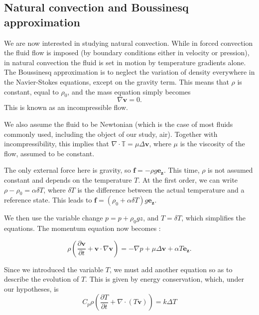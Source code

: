 \documentclass[12pt]{article}
\newcommand{\vb}[1]{\ensuremath{\mathbf{#1}}}
\begin{document}
\subsection{Natural convection and Boussinesq approximation}
We are now interested in studying natural convection. While in forced
convection the fluid flow is imposed (by boundary conditions either in
velocity or pression), in natural convection the fluid is set in
motion by temperature gradients alone. The Boussinesq approximation is
to neglect the variation of density everywhere in the Navier-Stokes
equations, except on the gravity term. This means that $\rho$ is
constant, equal to $\rho_0$, and the mass equation simply becomes
\begin{equation}
  \label{ns-b-mass}
  \nabla \vb{v} = 0.
\end{equation}
This is known as an incompressible flow.

We also assume the fluid to be Newtonian (which is the case of most
fluids commonly used, including the object of our study,
air). Together with incompressibility, this implies that $\nabla \cdot
\mathbb T = \mu \Delta \vb{v}$, where $\mu$ is the viscosity of the flow,
assumed to be constant.

The only external force here is gravity, so $\vb{f} = -\rho g
\vb{e_z}$. This time, $\rho$ is not assumed constant and depends on
the temperature $T$. At the first order, we can write $\rho - \rho_0 =
\alpha \delta T$, where $\delta T$ is the difference between the
actual temperature and a reference state. This leads to $\vb{f} =
(\rho_0 + \alpha \delta T) g \vb{e_z}$.

We then use the variable change $p = p + \rho_0 g z$, and $T = \delta
T$, which simplifies the equations. The momentum equation now becomes :

\begin{equation}
  \label{ns-mom}
  \rho \left(\frac{\partial \mathbf{v}}{\partial t} + \mathbf{v} \cdot
    \nabla \mathbf{v}\right) = -\nabla p + \mu \Delta \vb{v} + \alpha
  T \vb{e_z}.
\end{equation}

Since we introduced the variable $T$, we must add another equation so
as to describe the evolution of $T$. This is given by energy
conservation, which, under our hypotheses, is
\begin{equation}
  C_p \rho \left(\frac{\partial T}{\partial t} + \nabla \cdot (T \vb{v})\right) = k \Delta T
\end{equation}
\end{document}
